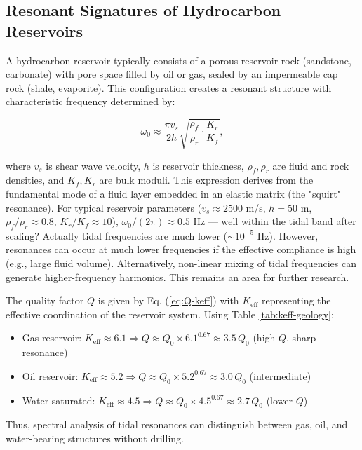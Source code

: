\documentclass[12pt,a4paper]{article}
\theoremstyle{remark}
\newcommand{\Keff}{K_{\mathrm{eff}}}
\begin{document}
	\subsection{Resonant Signatures of Hydrocarbon Reservoirs}
	
	A hydrocarbon reservoir typically consists of a porous reservoir rock (sandstone, carbonate) with pore space filled by oil or gas, sealed by an impermeable cap rock (shale, evaporite). This configuration creates a resonant structure with characteristic frequency determined by:
	
	\begin{equation}
		\omega_0 \approx \frac{\pi v_s}{2h} \sqrt{\frac{\rho_f}{\rho_r} \cdot \frac{K_r}{K_f}},
		\label{eq:resonant-frequency}
	\end{equation}
	
	where $v_s$ is shear wave velocity, $h$ is reservoir thickness, $\rho_f, \rho_r$ are fluid and rock densities, and $K_f, K_r$ are bulk moduli. This expression derives from the fundamental mode of a fluid layer embedded in an elastic matrix (the "squirt" resonance). For typical reservoir parameters ($v_s \approx 2500$ m/s, $h = 50$ m, $\rho_f/\rho_r \approx 0.8$, $K_r/K_f \approx 10$), $\omega_0/(2\pi) \approx 0.5$ Hz — well within the tidal band after scaling? Actually tidal frequencies are much lower ($\sim 10^{-5}$ Hz). However, resonances can occur at much lower frequencies if the effective compliance is high (e.g., large fluid volume). Alternatively, non-linear mixing of tidal frequencies can generate higher-frequency harmonics. This remains an area for further research.
	
	The quality factor $Q$ is given by Eq. (\ref{eq:Q-keff}) with $\Keff$ representing the effective coordination of the reservoir system. Using Table \ref{tab:keff-geology}:
	
	\begin{itemize}
		\item Gas reservoir: $\Keff \approx 6.1 \Rightarrow Q \approx Q_0 \times 6.1^{0.67} \approx 3.5\,Q_0$ (high $Q$, sharp resonance)
		\item Oil reservoir: $\Keff \approx 5.2 \Rightarrow Q \approx Q_0 \times 5.2^{0.67} \approx 3.0\,Q_0$ (intermediate)
		\item Water-saturated: $\Keff \approx 4.5 \Rightarrow Q \approx Q_0 \times 4.5^{0.67} \approx 2.7\,Q_0$ (lower $Q$)
	\end{itemize}
	
	Thus, spectral analysis of tidal resonances can distinguish between gas, oil, and water-bearing structures without drilling.
	
\end{document}
